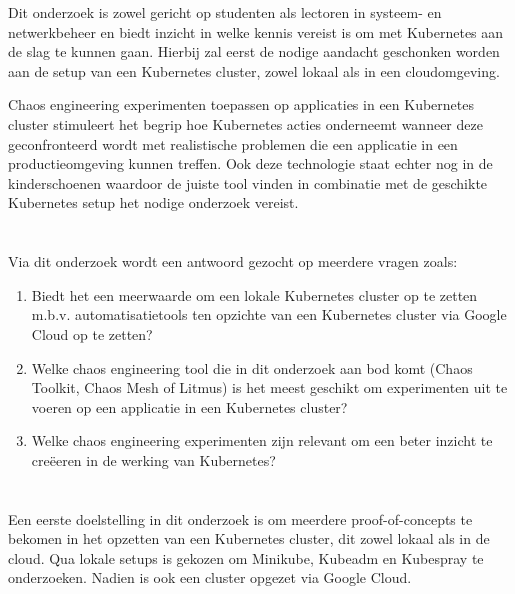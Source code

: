 Dit onderzoek is zowel gericht op studenten als lectoren in systeem- en netwerkbeheer en biedt inzicht in welke kennis vereist is om met Kubernetes aan de slag te kunnen gaan. Hierbij zal eerst de nodige aandacht geschonken worden aan de setup van een Kubernetes cluster, zowel lokaal als in een cloudomgeving. 

Chaos engineering experimenten toepassen op applicaties in een Kubernetes cluster stimuleert het begrip hoe Kubernetes acties onderneemt wanneer deze geconfronteerd wordt met realistische problemen die een applicatie in een productieomgeving kunnen treffen. Ook deze technologie staat echter nog in de kinderschoenen waardoor de juiste tool vinden in combinatie met de geschikte Kubernetes setup het nodige onderzoek vereist. 

\section{}
\label{sec:onderzoeksvraag}

Via dit onderzoek wordt een antwoord gezocht op meerdere vragen zoals:  
\begin{enumerate}
    \item Biedt het een meerwaarde om een lokale Kubernetes cluster op te zetten m.b.v. automatisatietools ten opzichte van een Kubernetes cluster via Google Cloud op te zetten?
    \item Welke chaos engineering tool die in dit onderzoek aan bod komt (Chaos Toolkit, Chaos Mesh of Litmus) is het meest geschikt om experimenten uit te voeren op een applicatie in een Kubernetes cluster?    
    \item Welke chaos engineering experimenten zijn relevant om een beter inzicht te creëeren in de werking van Kubernetes? 
\end{enumerate} 

\section{}
\label{sec:onderzoeksdoelstelling}

Een eerste doelstelling in dit onderzoek is om meerdere proof-of-concepts te bekomen in het opzetten van een Kubernetes cluster, dit zowel lokaal als in de cloud. Qua lokale setups is gekozen om Minikube, Kubeadm en Kubespray te onderzoeken. Nadien is ook een cluster opgezet via Google Cloud. 

